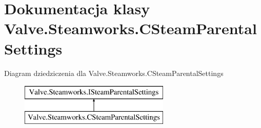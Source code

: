 \hypertarget{class_valve_1_1_steamworks_1_1_c_steam_parental_settings}{}\section{Dokumentacja klasy Valve.\+Steamworks.\+C\+Steam\+Parental\+Settings}
\label{class_valve_1_1_steamworks_1_1_c_steam_parental_settings}
Diagram dziedziczenia dla Valve.\+Steamworks.\+C\+Steam\+Parental\+Settings\begin{figure}[H]
\begin{center}
\leavevmode
\includegraphics[height=2.000000cm]{class_valve_1_1_steamworks_1_1_c_steam_parental_settings}
\end{center}
\end{figure}
